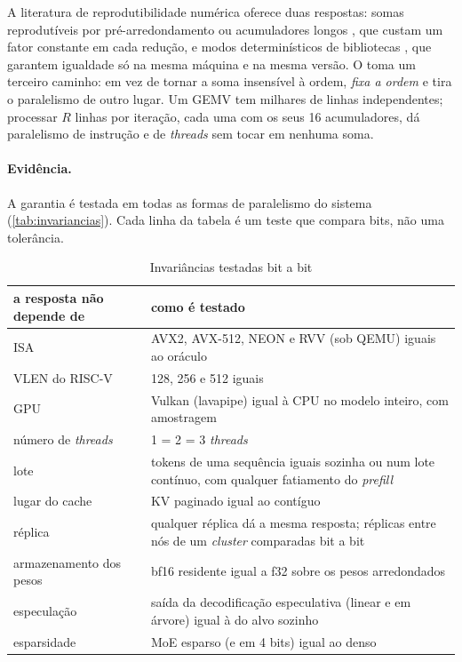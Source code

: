A literatura de reprodutibilidade numérica oferece duas respostas: somas reprodutíveis por pré-arredondamento ou acumuladores longos \cite{demmel2015}, que custam um fator constante em cada redução, e modos determinísticos de bibliotecas \cite{pytorchdeterminism}, que garantem igualdade só na mesma máquina e na mesma versão. O \vapor{} toma um terceiro caminho: em vez de tornar a soma insensível à ordem, \emph{fixa a ordem} e tira o paralelismo de outro lugar. Um GEMV tem milhares de linhas independentes; processar $R$ linhas por iteração, cada uma com os seus 16 acumuladores, dá paralelismo de instrução e de \textit{threads} sem tocar em nenhuma soma.

\paragraph{Evidência.} A garantia é testada em todas as formas de paralelismo do sistema (\autoref{tab:invariancias}). Cada linha da tabela é um teste que compara bits, não uma tolerância.

\begin{table}[htbp]
\centering
\caption{Invariâncias testadas bit a bit}\label{tab:invariancias}
\small
\begin{tabularx}{\textwidth}{@{}lX@{}}
\toprule
\textbf{a resposta não depende de} & \textbf{como é testado}\\
\midrule
ISA & AVX2, AVX-512, NEON e RVV (sob QEMU) iguais ao oráculo\\
VLEN do RISC-V & 128, 256 e 512 iguais\\
GPU & Vulkan (lavapipe) igual à CPU no modelo inteiro, com amostragem\\
número de \textit{threads} & 1 = 2 = 3 \textit{threads}\\
lote & tokens de uma sequência iguais sozinha ou num lote contínuo, com qualquer fatiamento do \textit{prefill}\\
lugar do cache & KV paginado igual ao contíguo\\
réplica & qualquer réplica dá a mesma resposta; réplicas entre nós de um \textit{cluster} comparadas bit a bit\\
armazenamento dos pesos & bf16 residente igual a f32 sobre os pesos arredondados\\
especulação & saída da decodificação especulativa (linear e em árvore) igual à do alvo sozinho\\
esparsidade & MoE esparso (e em 4 bits) igual ao denso\\
\bottomrule
\end{tabularx}
\end{table}

